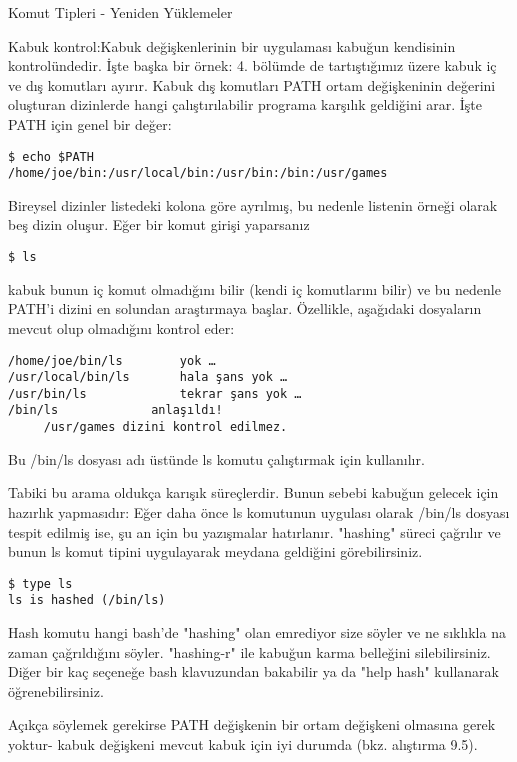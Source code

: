 \begin{section}{Komut Tipleri - Yeniden Yüklemeler}

Kabuk kontrol:Kabuk değişkenlerinin bir uygulaması kabuğun kendisinin kontrolündedir. İşte başka bir örnek: 4. bölümde de tartıştığımız üzere kabuk iç ve dış komutları ayırır. Kabuk dış komutları PATH ortam değişkeninin değerini oluşturan dizinlerde hangi çalıştırılabilir programa karşılık geldiğini arar. İşte PATH için genel bir değer:
\begin{verbatim}
$ echo $PATH
/home/joe/bin:/usr/local/bin:/usr/bin:/bin:/usr/games
\end{verbatim}

Bireysel dizinler listedeki kolona göre ayrılmış, bu nedenle listenin örneği olarak beş dizin oluşur. Eğer bir komut girişi yaparsanız
\begin{verbatim}
$ ls
\end{verbatim}

kabuk bunun iç komut olmadığını bilir (kendi iç komutlarını bilir) ve bu nedenle PATH'i dizini en solundan araştırmaya başlar. Özellikle, aşağıdaki dosyaların mevcut olup olmadığını kontrol eder:
\begin{verbatim}
/home/joe/bin/ls 		yok …
/usr/local/bin/ls 		hala şans yok …
/usr/bin/ls 			tekrar şans yok …
/bin/ls 			anlaşıldı!
     /usr/games dizini kontrol edilmez.
\end{verbatim}

Bu /bin/ls dosyası adı üstünde ls komutu çalıştırmak için kullanılır. 

Tabiki bu arama oldukça karışık süreçlerdir. Bunun sebebi kabuğun gelecek için hazırlık yapmasıdır: Eğer daha önce ls komutunun uygulası olarak /bin/ls
dosyası tespit edilmiş ise, şu an için bu yazışmalar hatırlanır. "hashing" süreci çağrılır ve bunun ls komut tipini uygulayarak meydana geldiğini görebilirsiniz.
\begin{verbatim}
$ type ls
ls is hashed (/bin/ls)
\end{verbatim} 

Hash komutu hangi bash'de "hashing" olan emrediyor size söyler ve ne sıklıkla na zaman çağrıldığını söyler. "hashing-r" ile kabuğun karma belleğini 	silebilirsiniz. Diğer bir kaç seçeneğe bash klavuzundan bakabilir ya da "help hash" kullanarak öğrenebilirsiniz.

Açıkça söylemek gerekirse PATH değişkenin bir ortam değişkeni olmasına gerek yoktur- kabuk değişkeni mevcut kabuk için iyi durumda (bkz. alıştırma 9.5).


\end{section}
